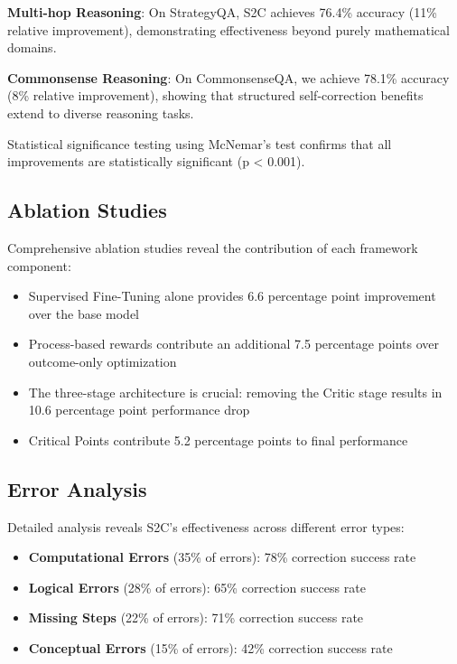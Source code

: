 \documentclass[10pt,twocolumn]{article}
\newcommand{\ssc}{\textsc{S2C}}
\begin{document}
\textbf{Multi-hop Reasoning}: On StrategyQA, \ssc{} achieves 76.4\% accuracy (11\% relative improvement), demonstrating effectiveness beyond purely mathematical domains.

\textbf{Commonsense Reasoning}: On CommonsenseQA, we achieve 78.1\% accuracy (8\% relative improvement), showing that structured self-correction benefits extend to diverse reasoning tasks.

Statistical significance testing using McNemar's test confirms that all improvements are statistically significant (p < 0.001).

\subsection{Ablation Studies}

Comprehensive ablation studies reveal the contribution of each framework component:

\begin{itemize}
\item Supervised Fine-Tuning alone provides 6.6 percentage point improvement over the base model
\item Process-based rewards contribute an additional 7.5 percentage points over outcome-only optimization
\item The three-stage architecture is crucial: removing the Critic stage results in 10.6 percentage point performance drop
\item Critical Points contribute 5.2 percentage points to final performance
\end{itemize}

\subsection{Error Analysis}

Detailed analysis reveals \ssc{}'s effectiveness across different error types:

\begin{itemize}
\item \textbf{Computational Errors} (35\% of errors): 78\% correction success rate
\item \textbf{Logical Errors} (28\% of errors): 65\% correction success rate
\item \textbf{Missing Steps} (22\% of errors): 71\% correction success rate
\item \textbf{Conceptual Errors} (15\% of errors): 42\% correction success rate
\end{itemize}
\end{document}
